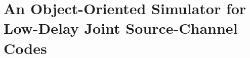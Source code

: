 \chapter[A Simulator for Joint Source-Channel Codes]%
{An Object-Oriented Simulator for Low-Delay Joint Source-Channel Codes}
